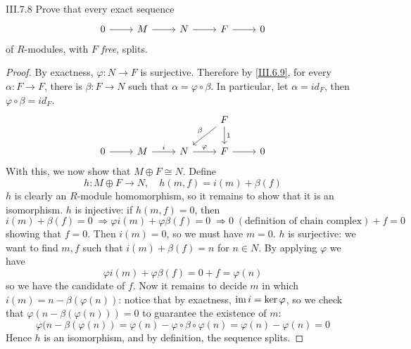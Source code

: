 \begin{problem}{III.7.8}
Prove that every exact sequence
\[
\begin{tikzcd}
0 \arrow[r] &M \arrow[r] &N \arrow[r] &F \arrow[r] &0
\end{tikzcd}
\]
of $R$-modules, with $F$ \emph{free}, splits.
\end{problem}
\begin{proof}
By exactness, $\varphi :N \longrightarrow F$ is surjective. Therefore by \ref{III.6.9}, for every $\alpha : F \to F$, there is $\beta : F \to N$ such that $\alpha = \varphi \circ \beta$. In particular, let $\alpha = id_F$, then $\varphi \circ \beta = id_F$. 
\[
\begin{tikzcd}
&  &  & F \arrow[d, "1"] \arrow[ld, "\beta"'] &   \\
0 \arrow[r] & M \arrow[r, "i"] & N \arrow[r, "\varphi"] & F \arrow[r]                           & 0
\end{tikzcd}	
\]
With this, we now show that $M \oplus F \cong N$. Define 
\[
h: M \oplus F \to N, \quad	h(m,f) = i(m) + \beta(f)
\]
$h$ is clearly an $R$-module homomorphism, so it remains to show that it is an isomorphism. $h$ is injective: if $h(m,f) = 0$, then
\[
i(m) + \beta(f) = 0 \; \Rightarrow \varphi i(m) + \varphi \beta (f) = 0 \; \Rightarrow 0 \; (\text{definition of chain complex}) + f = 0
\]
showing that $f = 0$. Then $i(m) = 0$, so we must have $m = 0$. $h$ is surjective: we want to find $m,f$ such that $i(m) + \beta(f) = n$ for $n \in N$. By applying $\varphi$ we have
\[
\varphi i(m) + \varphi \beta (f) = 0 + f = \varphi(n)	
\]
so we have the candidate of $f$. Now it remains to decide $m$ in which $i(m) = n - \beta(\varphi(n))$: notice that by exactness, $\operatorname{im} i = \ker \varphi$, so we check that $\varphi(n - \beta(\varphi(n))) = 0$ to guarantee the existence of $m$:
\[
\varphi(n - \beta(\varphi(n)) = \varphi(n) - \varphi \circ \beta \circ \varphi(n) = \varphi(n) - \varphi(n) = 0
\]
Hence $h$ is an isomorphism, and by definition, the sequence splits.
\end{proof}